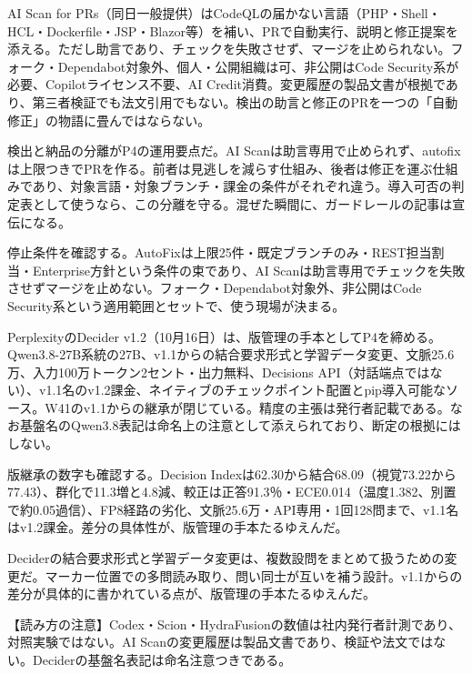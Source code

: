 \documentclass[lualatex,a4paper,10pt]{jlreq}
\begin{document}
AI Scan for PRs（同日一般提供）はCodeQLの届かない言語（PHP・Shell・HCL・Dockerfile・JSP・Blazor等）を補い、PRで自動実行、説明と修正提案を添える。ただし助言であり、チェックを失敗させず、マージを止められない。フォーク・Dependabot対象外、個人・公開組織は可、非公開はCode Security系が必要、Copilotライセンス不要、AI Credit消費。変更履歴の製品文書が根拠であり、第三者検証でも法文引用でもない。検出の助言と修正のPRを一つの「自動修正」の物語に畳んではならない。
\cite{B35,B78}


検出と納品の分離がP4の運用要点だ。AI Scanは助言専用で止められず、autofixは上限つきでPRを作る。前者は見逃しを減らす仕組み、後者は修正を運ぶ仕組みであり、対象言語・対象ブランチ・課金の条件がそれぞれ違う。導入可否の判定表として使うなら、この分離を守る。混ぜた瞬間に、ガードレールの記事は宣伝になる。
\cite{B34,B77,B35,B78}


停止条件を確認する。AutoFixは上限25件・既定ブランチのみ・REST担当割当・Enterprise方針という条件の束であり、AI Scanは助言専用でチェックを失敗させずマージを止めない。フォーク・Dependabot対象外、非公開はCode Security系という適用範囲とセットで、使う現場が決まる。
\cite{B34,B77,B35,B78}


PerplexityのDecider v1.2（10月16日）は、版管理の手本としてP4を締める。Qwen3.8-27B系統の27B、v1.1からの結合要求形式と学習データ変更、文脈25.6万、入力100万トークン2セント・出力無料、Decisions API（対話端点ではない）、v1.1名のv1.2課金、ネイティブのチェックポイント配置とpip導入可能なソース。W41のv1.1からの継承が閉じている。精度の主張は発行者記載である。なお基盤名のQwen3.8表記は命名上の注意として添えられており、断定の根拠にはしない。
\cite{B37,B36,B38}


版継承の数字も確認する。Decision Indexは62.30から結合68.09（視覚73.22から77.43）、群化で11.3増と4.8減、較正は正答91.3％・ECE0.014（温度1.382、別置で約0.05過信）、FP8経路の劣化、文脈25.6万・API専用・1回128問まで、v1.1名はv1.2課金。差分の具体性が、版管理の手本たるゆえんだ。
\cite{B37,B36,B38}


Deciderの結合要求形式と学習データ変更は、複数設問をまとめて扱うための変更だ。マーカー位置での多問読み取り、問い同士が互いを補う設計。v1.1からの差分が具体的に書かれている点が、版管理の手本たるゆえんだ。
\cite{B37,B36,B38}


\begin{tcolorbox}[colback=SurveySoft,colframe=SurveyRule,arc=1mm,boxrule=0.4pt,left=2mm,right=2mm]
【読み方の注意】Codex・Scion・HydraFusionの数値は社内発行者計測であり、対照実験ではない。AI Scanの変更履歴は製品文書であり、検証や法文ではない。Deciderの基盤名表記は命名注意つきである。
\end{tcolorbox}
\cite{B31,B32,B75,B33,B76,B34,B77,B35,B78,B37,B36,B38}
\end{document}
